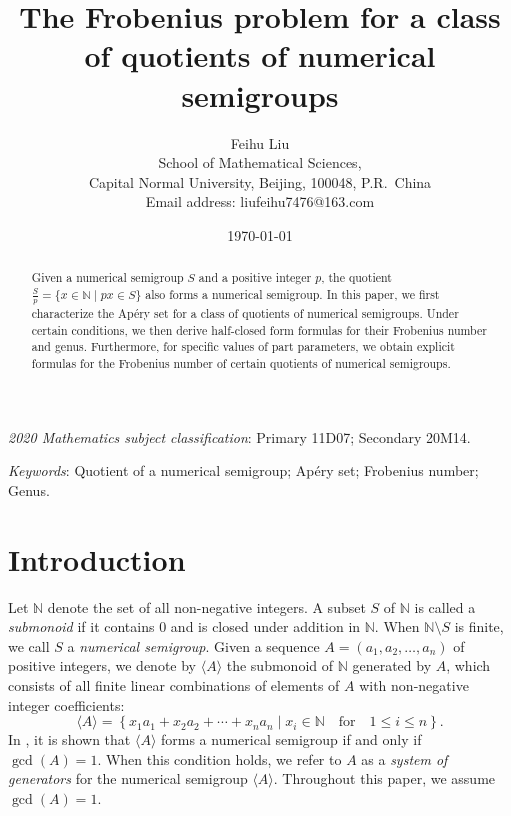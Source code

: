 \documentclass[reqno, 12pt]{article}
\title{The Frobenius problem for a class of quotients of numerical semigroups}
\author{Feihu Liu
\\[2mm]
{\small School of Mathematical Sciences,}\\[-0.8ex]
{\small Capital Normal University, Beijing, 100048, P.R.~China}\\
{\small Email address: liufeihu7476@163.com}\\
}
\date{\today}
\theoremstyle{mydefinition}
\theoremstyle{myremark}
\numberwithin{algorithm}{section}
\begin{document}
\maketitle

\begin{abstract}
Given a numerical semigroup $S$ and a positive integer $p$, the quotient $\frac{S}{p}=\{x\in \mathbb{N} \mid px\in S\}$ also forms a numerical semigroup. In this paper, we first characterize the Ap\'ery set for a class of quotients of numerical semigroups.  
Under certain conditions, we then derive half-closed form formulas for their Frobenius number and genus.
Furthermore, for specific values of part parameters, we obtain explicit formulas for the Frobenius number of certain quotients of numerical semigroups.
\end{abstract}

\noindent
\begin{small}
\emph{2020 Mathematics subject classification}: Primary 11D07; Secondary 20M14.
\end{small}

\noindent
\begin{small}
\emph{Keywords}: Quotient of a numerical semigroup; Ap\'ery set; Frobenius number; Genus.
\end{small}


\section{Introduction}

Let $\mathbb{N}$ denote the set of all non-negative integers.
A subset $S$ of $\mathbb{N}$ is called a \emph{submonoid} if it contains $0$ and is closed under addition in $\mathbb{N}$.
When $\mathbb{N}\setminus S$ is finite, we call $S$ a \emph{numerical semigroup}.
Given a sequence $A = (a_1, a_2, \ldots, a_n)$ of positive integers, we denote by $\langle A \rangle$ the submonoid of $\mathbb{N}$ generated by $A$, which consists of all finite linear combinations of elements of $A$ with non-negative integer coefficients:
$$\langle A \rangle = \left\{ x_1a_1+x_2a_2+\cdots+x_na_n \mid x_i \in \mathbb{N}\quad \text{for}\quad 1 \leq i \leq n \right\}.$$
In \cite[Lemma 2.1]{J.C.Rosales}, it is shown that $\langle A\rangle$ forms a numerical semigroup if and only if $\gcd(A)=1$.
When this condition holds, we refer to $A$ as a \emph{system of generators} for the numerical semigroup $\langle A\rangle$.
Throughout this paper, we assume $\gcd(A)=1$.
\end{document}
